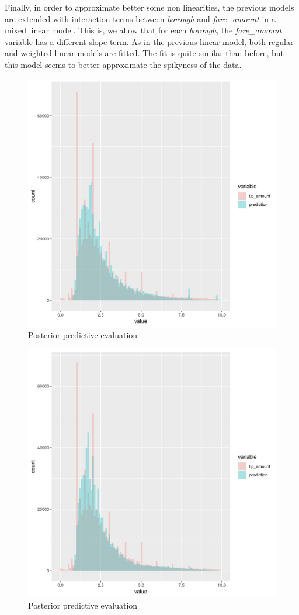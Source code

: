 \documentclass[11pt]{article}
\begin{document}
Finally, in order to approximate better some non linearities, the
previous models are extended with interaction terms between \emph{borough}
and \emph{fare\_amount} in a mixed linear model. This is, we allow that for
each \emph{borough}, the \emph{fare\_amount} variable has a different slope term.
As in the previous linear model, both regular and weighted linear models
are fitted. The fit is quite similar than before, but this model seems
to better approximate the spikyness of the data.

\begin{figure}[htbp]
\centering
\includegraphics[width=.9\linewidth]{./plots/evaluation4PosteriorPredictive.jpg}
\caption{\label{fig:org8872adb}
Posterior predictive evaluation}
\end{figure}

\begin{figure}[htbp]
\centering
\includegraphics[width=.9\linewidth]{./plots/evaluation5PosteriorPredictive.jpg}
\caption{\label{fig:org9b8f82e}
Posterior predictive evaluation}
\end{figure}
\end{document}
